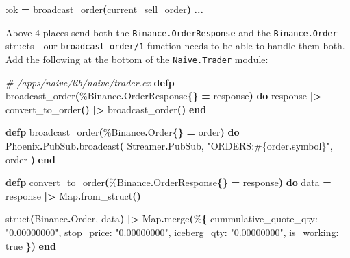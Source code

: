 \documentclass[
  oneside]{book}
\newenvironment{Shaded}{\begin{snugshade}}{\end{snugshade}}
\newcommand{\CommentTok}[1]{\textcolor[rgb]{0.56,0.35,0.01}{\textit{#1}}}
\newcommand{\ConstantTok}[1]{\textcolor[rgb]{0.56,0.35,0.01}{#1}}
\newcommand{\FunctionTok}[1]{\textcolor[rgb]{0.13,0.29,0.53}{\textbf{#1}}}
\newcommand{\KeywordTok}[1]{\textcolor[rgb]{0.13,0.29,0.53}{\textbf{#1}}}
\newcommand{\NormalTok}[1]{#1}
\newcommand{\OperatorTok}[1]{\textcolor[rgb]{0.81,0.36,0.00}{\textbf{#1}}}
\newcommand{\OtherTok}[1]{\textcolor[rgb]{0.56,0.35,0.01}{#1}}
\newcommand{\StringTok}[1]{\textcolor[rgb]{0.31,0.60,0.02}{#1}}
\newcommand{\VariableTok}[1]{\textcolor[rgb]{0.00,0.00,0.00}{#1}}
\begin{document}
\begin{Shaded}
\begin{Highlighting}[]
    \VariableTok{:ok} \OperatorTok{=}\NormalTok{ broadcast\_order}\FunctionTok{(}\NormalTok{current\_sell\_order}\FunctionTok{)}
    \OperatorTok{...}
\end{Highlighting}
\end{Shaded}

Above 4 places send both the \texttt{Binance.OrderResponse} and the \texttt{Binance.Order} structs - our \texttt{broadcast\_order/1} function needs to be able to handle them both. Add the following at the bottom of the \texttt{Naive.Trader} module:

\begin{Shaded}
\begin{Highlighting}[]
  \CommentTok{\# /apps/naive/lib/naive/trader.ex}
  \KeywordTok{defp}\NormalTok{ broadcast\_order}\FunctionTok{(}\NormalTok{\%}\ConstantTok{Binance}\OperatorTok{.}\ConstantTok{OrderResponse}\FunctionTok{\{\}} \OperatorTok{=}\NormalTok{ response}\FunctionTok{)} \KeywordTok{do}
\NormalTok{    response}
    \OperatorTok{|\textgreater{}}\NormalTok{ convert\_to\_order}\FunctionTok{()}
    \OperatorTok{|\textgreater{}}\NormalTok{ broadcast\_order}\FunctionTok{()}
  \KeywordTok{end}

  \KeywordTok{defp}\NormalTok{ broadcast\_order}\FunctionTok{(}\NormalTok{\%}\ConstantTok{Binance}\OperatorTok{.}\ConstantTok{Order}\FunctionTok{\{\}} \OperatorTok{=}\NormalTok{ order}\FunctionTok{)} \KeywordTok{do}
    \ConstantTok{Phoenix}\OperatorTok{.}\ConstantTok{PubSub}\OperatorTok{.}\NormalTok{broadcast}\FunctionTok{(}
      \ConstantTok{Streamer}\OperatorTok{.}\ConstantTok{PubSub}\NormalTok{,}
      \StringTok{"ORDERS:}\OtherTok{\#\{}\NormalTok{order}\OperatorTok{.}\NormalTok{symbol}\OtherTok{\}}\StringTok{"}\NormalTok{,}
\NormalTok{      order}
    \FunctionTok{)}
  \KeywordTok{end}

  \KeywordTok{defp}\NormalTok{ convert\_to\_order}\FunctionTok{(}\NormalTok{\%}\ConstantTok{Binance}\OperatorTok{.}\ConstantTok{OrderResponse}\FunctionTok{\{\}} \OperatorTok{=}\NormalTok{ response}\FunctionTok{)} \KeywordTok{do}
\NormalTok{    data }\OperatorTok{=}
\NormalTok{      response}
      \OperatorTok{|\textgreater{}} \ConstantTok{Map}\OperatorTok{.}\NormalTok{from\_struct}\FunctionTok{()}

\NormalTok{    struct}\FunctionTok{(}\ConstantTok{Binance}\OperatorTok{.}\ConstantTok{Order}\NormalTok{, data}\FunctionTok{)}
    \OperatorTok{|\textgreater{}} \ConstantTok{Map}\OperatorTok{.}\NormalTok{merge}\FunctionTok{(}\NormalTok{\%}\FunctionTok{\{}
      \VariableTok{cummulative\_quote\_qty:} \StringTok{"0.00000000"}\NormalTok{,}
      \VariableTok{stop\_price:} \StringTok{"0.00000000"}\NormalTok{,}
      \VariableTok{iceberg\_qty:} \StringTok{"0.00000000"}\NormalTok{,}
      \VariableTok{is\_working:} \ConstantTok{true}
    \FunctionTok{\})}
  \KeywordTok{end}
\end{Highlighting}
\end{Shaded}
\end{document}
